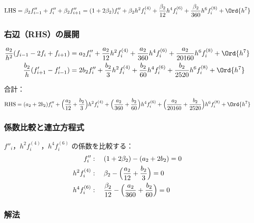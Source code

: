 \begin{equation}
  \text{LHS} = \beta_2 f''_{i-1} + f''_i + \beta_2 f''_{i+1}
  = (1+2\beta_2)f''_i + \beta_2 h^2 f^{(4)}_i
    + \frac{\beta_2}{12}h^4 f^{(6)}_i + \frac{\beta_2}{360}h^6 f^{(8)}_i + \Ord{h^7}
\end{equation}

\subsubsection*{右辺（RHS）の展開}

\begin{align}
  \frac{a_2}{h^2}(f_{i-1}-2f_i+f_{i+1})
  &= a_2 f''_i + \frac{a_2}{12}h^2 f^{(4)}_i + \frac{a_2}{360}h^4 f^{(6)}_i
     + \frac{a_2}{20160}h^6 f^{(8)}_i + \Ord{h^7} \\
  \frac{b_2}{h}(f'_{i+1}-f'_{i-1})
  &= 2b_2 f''_i + \frac{b_2}{3}h^2 f^{(4)}_i + \frac{b_2}{60}h^4 f^{(6)}_i
     + \frac{b_2}{2520}h^6 f^{(8)}_i + \Ord{h^7}
\end{align}

合計：
\begin{equation}
  \text{RHS} = (a_2+2b_2)f''_i
  + \Bigl(\frac{a_2}{12}+\frac{b_2}{3}\Bigr)h^2 f^{(4)}_i
  + \Bigl(\frac{a_2}{360}+\frac{b_2}{60}\Bigr)h^4 f^{(6)}_i
  + \Bigl(\frac{a_2}{20160}+\frac{b_2}{2520}\Bigr)h^6 f^{(8)}_i + \Ord{h^7}
\end{equation}

\subsubsection*{係数比較と連立方程式}

$f''_i$，$h^2 f^{(4)}_i$，$h^4 f^{(6)}_i$ の係数を比較する：
\begin{align}
  f''_i        &:\quad (1+2\beta_2) - (a_2+2b_2) = 0 \label{eq:app_II_eq1} \\
  h^2 f^{(4)}_i &:\quad \beta_2 - \Bigl(\frac{a_2}{12}+\frac{b_2}{3}\Bigr) = 0 \label{eq:app_II_eq2} \\
  h^4 f^{(6)}_i &:\quad \frac{\beta_2}{12} - \Bigl(\frac{a_2}{360}+\frac{b_2}{60}\Bigr) = 0 \label{eq:app_II_eq3}
\end{align}

\subsubsection*{解法}

